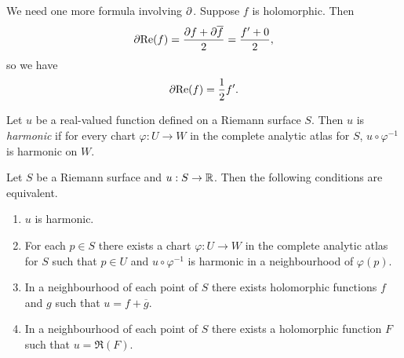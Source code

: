 \documentclass[a4paper,11pt]{article}
\begin{document}
We need one more formula involving $\partial$.  Suppose $f$ is holomorphic.
Then
$$
\p \Re(f) = \frac{\p f + \p \overline{f}}{2} = \frac{f'+0}{2},
$$
so we have
\begin{equation}
  \label{e:3}
  \p \Re(f) = \frac{1}{2}f'.
\end{equation}

\begin{defn}
  \label{def:1}
  Let $u$ be a real-valued function defined on a Riemann surface $S$.
  Then $u$ is \emph{harmonic} if for every chart $\varphi : U \to W$
  in the complete analytic atlas for $S$, $u\circ \varphi^{-1}$ is
  harmonic on $W$.
\end{defn}

\begin{propn}
  \label{propn:1}
  Let $S$ be a Riemann surface and $u : S \to {\mathbb R}$.  Then the
  following conditions are equivalent.
  \begin{enumerate}
  \item $u$ is harmonic.
  \item For each $p \in S$ there exists a chart $\varphi : U \to W$ in
    the complete analytic atlas for $S$ such that $p \in U$ and $u
    \circ \varphi^{-1}$ is harmonic in a neighbourhood of $\varphi(p)$.
  \item In a neighbourhood of each point of $S$ there exists
    holomorphic functions $f$ and $g$ such that $u = f +
    \overline{g}$.
  \item In a neighbourhood of each point of $S$ there exists a
    holomorphic function $F$ such that $u = \Re(F)$.
  \end{enumerate}
\end{propn}
\end{document}
